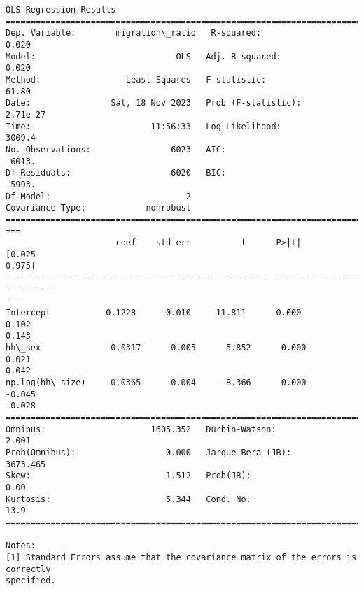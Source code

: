 \documentclass[11pt]{article}
\begin{document}
    \begin{Verbatim}[commandchars=\\\{\}]
                            OLS Regression Results
==============================================================================
Dep. Variable:        migration\_ratio   R-squared:                       0.020
Model:                            OLS   Adj. R-squared:                  0.020
Method:                 Least Squares   F-statistic:                     61.80
Date:                Sat, 18 Nov 2023   Prob (F-statistic):           2.71e-27
Time:                        11:56:33   Log-Likelihood:                 3009.4
No. Observations:                6023   AIC:                            -6013.
Df Residuals:                    6020   BIC:                            -5993.
Df Model:                           2
Covariance Type:            nonrobust
================================================================================
===
                      coef    std err          t      P>|t|      [0.025
0.975]
--------------------------------------------------------------------------------
---
Intercept           0.1228      0.010     11.811      0.000       0.102
0.143
hh\_sex              0.0317      0.005      5.852      0.000       0.021
0.042
np.log(hh\_size)    -0.0365      0.004     -8.366      0.000      -0.045
-0.028
==============================================================================
Omnibus:                     1605.352   Durbin-Watson:                   2.001
Prob(Omnibus):                  0.000   Jarque-Bera (JB):             3673.465
Skew:                           1.512   Prob(JB):                         0.00
Kurtosis:                       5.344   Cond. No.                         13.9
==============================================================================

Notes:
[1] Standard Errors assume that the covariance matrix of the errors is correctly
specified.
    \end{Verbatim}
\end{document}

